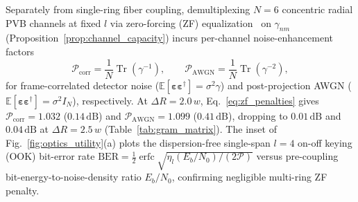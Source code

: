 \documentclass[aps,pra,reprint,amsmath,amssymb,floatfix,longbibliography]{revtex4-2}
\begin{document}
Separately from single-ring fiber coupling, demultiplexing $N = 6$ concentric radial PVB channels at fixed $l$ via zero-forcing (ZF) equalization~\cite{Willner2015,Wang2019,Proakis2008} on $\gamma_{nm}$ (Proposition~\ref{prop:channel_capacity}) incurs per-channel noise-enhancement factors
\begin{equation}
\mathcal{P}_{\mathrm{corr}} = \frac{1}{N}\operatorname{Tr}(\gamma^{-1}), \qquad \mathcal{P}_{\mathrm{AWGN}} = \frac{1}{N}\operatorname{Tr}(\gamma^{-2}),
\label{eq:zf_penalties}
\end{equation}
for frame-correlated detector noise ($\mathbb{E}[\boldsymbol{\varepsilon}\boldsymbol{\varepsilon}^\dagger] = \sigma^2 \gamma$) and post-projection AWGN ($\mathbb{E}[\boldsymbol{\varepsilon}\boldsymbol{\varepsilon}^\dagger] = \sigma^2 I_N$), respectively. At $\Delta R = 2.0\,w$, Eq.~\eqref{eq:zf_penalties} gives $\mathcal{P}_{\mathrm{corr}} = 1.032$ ($0.14\,\mathrm{dB}$) and $\mathcal{P}_{\mathrm{AWGN}} = 1.099$ ($0.41\,\mathrm{dB}$), dropping to $0.01\,\mathrm{dB}$ and $0.04\,\mathrm{dB}$ at $\Delta R = 2.5\,w$ (Table~\ref{tab:gram_matrix}). The inset of Fig.~\ref{fig:optics_utility}(a) plots the dispersion-free single-span $l = 4$ on-off keying (OOK) bit-error rate $\mathrm{BER} = \frac{1}{2}\operatorname{erfc}\sqrt{\eta_l (E_b/N_0)/(2\mathcal{P})}$ versus pre-coupling bit-energy-to-noise-density ratio $E_b/N_0$, confirming negligible multi-ring ZF penalty.
\end{document}
